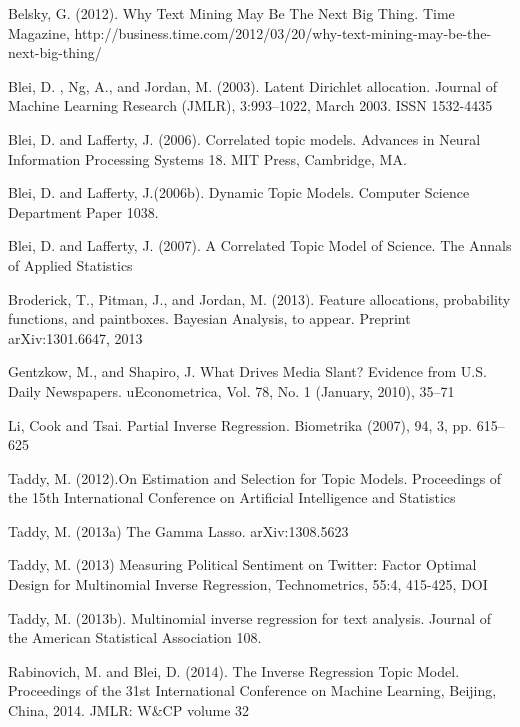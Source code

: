 \documentclass[12pt]{article}
\begin{document}
\begin{thebibliography}{99}

 Belsky, G. (2012). Why Text Mining May Be The Next Big Thing. Time Magazine, http://business.time.com/2012/03/20/why-text-mining-may-be-the-next-big-thing/

 Blei, D. , Ng, A., and Jordan, M. (2003). Latent Dirichlet allocation. Journal of Machine Learning Research (JMLR), 3:993–1022, March 2003. ISSN 1532-4435

 Blei, D. and Lafferty, J. (2006). Correlated topic models. Advances in Neural Information Processing Systems 18. MIT Press, Cambridge, MA.

 Blei, D. and Lafferty, J.(2006b). Dynamic Topic Models. Computer Science Department Paper 1038.

  Blei, D. and Lafferty, J. (2007). A Correlated Topic Model of Science. The Annals of Applied Statistics

 Broderick, T.,  Pitman, J.,  and Jordan, M. (2013). Feature allocations, probability functions, and paintboxes. Bayesian Analysis, to appear. Preprint arXiv:1301.6647, 2013

 Gentzkow, M., and  Shapiro, J. What Drives Media Slant? Evidence from U.S. Daily Newspapers. uEconometrica, Vol. 78, No. 1 (January, 2010), 35–71

  Li, Cook  and Tsai. Partial Inverse Regression. Biometrika (2007), 94, 3, pp. 615–625

 Taddy, M. (2012).On Estimation and Selection for Topic Models.  Proceedings of the 15th International Conference on Artificial Intelligence and Statistics

 Taddy, M.  (2013a) The Gamma Lasso. arXiv:1308.5623

\bibitem Taddy, M.  (2013) Measuring Political Sentiment on Twitter: Factor Optimal Design for Multinomial
Inverse Regression, Technometrics, 55:4, 415-425, DOI

 Taddy, M. (2013b). Multinomial inverse regression for text analysis. Journal of the American Statistical Association 108.

 Rabinovich, M. and Blei, D. (2014). The Inverse Regression Topic Model. Proceedings of the 31st International Conference on Machine Learning, Beijing, China, 2014. JMLR: W\&CP volume 32








\end{thebibliography}
\end{document}
